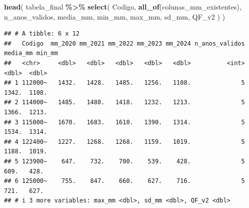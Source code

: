 \documentclass[
]{article}
\newenvironment{Shaded}{\begin{snugshade}}{\end{snugshade}}
\newcommand{\FunctionTok}[1]{\textcolor[rgb]{0.13,0.29,0.53}{\textbf{#1}}}
\newcommand{\NormalTok}[1]{#1}
\newcommand{\SpecialCharTok}[1]{\textcolor[rgb]{0.81,0.36,0.00}{\textbf{#1}}}
\begin{document}
\begin{Shaded}
\begin{Highlighting}[]
\FunctionTok{head}\NormalTok{(}
\NormalTok{  tabela\_final }\SpecialCharTok{\%\textgreater{}\%}
    \FunctionTok{select}\NormalTok{(}
\NormalTok{      Codigo,}
      \FunctionTok{all\_of}\NormalTok{(colunas\_mm\_existentes),}
\NormalTok{      n\_anos\_validos,}
\NormalTok{      media\_mm,}
\NormalTok{      min\_mm,}
\NormalTok{      max\_mm,}
\NormalTok{      sd\_mm,}
\NormalTok{      QF\_v2}
\NormalTok{    )}
\NormalTok{)}
\end{Highlighting}
\end{Shaded}

\begin{verbatim}
## # A tibble: 6 x 12
##   Codigo  mm_2020 mm_2021 mm_2022 mm_2023 mm_2024 n_anos_validos media_mm min_mm
##   <chr>     <dbl>   <dbl>   <dbl>   <dbl>   <dbl>          <int>    <dbl>  <dbl>
## 1 112000~   1432.   1428.   1485.   1256.   1108.              5    1342.  1108.
## 2 114000~   1485.   1480.   1418.   1232.   1213.              5    1366.  1213.
## 3 115000~   1670.   1683.   1610.   1390.   1314.              5    1534.  1314.
## 4 122400~   1227.   1268.   1268.   1159.   1019.              5    1188.  1019.
## 5 123900~    647.    732.    700.    539.    428.              5     609.   428.
## 6 125000~    755.    847.    660.    627.    716.              5     721.   627.
## # i 3 more variables: max_mm <dbl>, sd_mm <dbl>, QF_v2 <dbl>
\end{verbatim}
\end{document}
